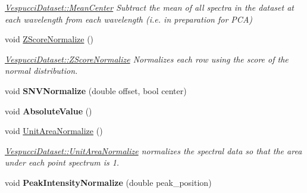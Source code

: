 \begin{DoxyCompactItemize}
\begin{DoxyCompactList}\small\item\em \hyperlink{class_vespucci_dataset_af60babe573316c3e65fe1efa5be88964}{Vespucci\+Dataset\+::\+Mean\+Center} Subtract the mean of all spectra in the dataset at each wavelength from each wavelength (i.\+e. in preparation for P\+CA) \end{DoxyCompactList}\item 
void \hyperlink{class_vespucci_dataset_ab2569b51fd98135d25f349438d95ae37}{Z\+Score\+Normalize} ()\hypertarget{class_vespucci_dataset_ab2569b51fd98135d25f349438d95ae37}{}\label{class_vespucci_dataset_ab2569b51fd98135d25f349438d95ae37}

\begin{DoxyCompactList}\small\item\em \hyperlink{class_vespucci_dataset_ab2569b51fd98135d25f349438d95ae37}{Vespucci\+Dataset\+::\+Z\+Score\+Normalize} Normalizes each row using the score of the normal distribution. \end{DoxyCompactList}\item 
void {\bfseries S\+N\+V\+Normalize} (double offset, bool center)\hypertarget{class_vespucci_dataset_ade3c1ad161e645182893d048d18285c1}{}\label{class_vespucci_dataset_ade3c1ad161e645182893d048d18285c1}

\item 
void {\bfseries Absolute\+Value} ()\hypertarget{class_vespucci_dataset_a7d792a061bb5f20c71b25630f472b45d}{}\label{class_vespucci_dataset_a7d792a061bb5f20c71b25630f472b45d}

\item 
void \hyperlink{class_vespucci_dataset_abcd2b804a6995abfb2d2fcb7e8380e80}{Unit\+Area\+Normalize} ()\hypertarget{class_vespucci_dataset_abcd2b804a6995abfb2d2fcb7e8380e80}{}\label{class_vespucci_dataset_abcd2b804a6995abfb2d2fcb7e8380e80}

\begin{DoxyCompactList}\small\item\em \hyperlink{class_vespucci_dataset_abcd2b804a6995abfb2d2fcb7e8380e80}{Vespucci\+Dataset\+::\+Unit\+Area\+Normalize} normalizes the spectral data so that the area under each point spectrum is 1. \end{DoxyCompactList}\item 
void {\bfseries Peak\+Intensity\+Normalize} (double peak\+\_\+position)\hypertarget{class_vespucci_dataset_a6c999f6492662781ea7ee26e4c38e574}{}\label{class_vespucci_dataset_a6c999f6492662781ea7ee26e4c38e574}


\end{DoxyCompactItemize}
